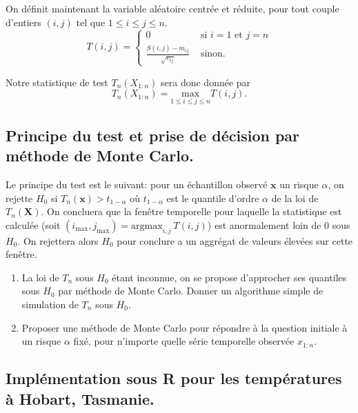 \documentclass[]{article}
\begin{document}
On définit maintenant la variable aléatoire centrée et réduite, pour
tout couple d'entiers \((i, j)\) tel que \(1 \leq i\leq j\leq n\).
\[T(i, j) = \left\lbrace \begin{array}{lr}
0&\text{ si } i = 1 \text{ et } j = n\\
\frac{S(i, j) - m_{ij}}{\sqrt{v_{ij}}} & \text{ sinon.} 
\end{array}
\right.\]

Notre statistique de test \(T_n(X_{1:n})\) sera donc donnée par
\begin{equation}
\label{eq:stat:T}
T_n(X_{1:n}) = \underset{1 \leq i\leq j\leq n}{\text{max}} T(i, j).
\end{equation}

\hypertarget{principe-du-test-et-prise-de-duxe9cision-par-muxe9thode-de-monte-carlo.}{%
\subsection{Principe du test et prise de décision par méthode de Monte
Carlo.}\label{principe-du-test-et-prise-de-duxe9cision-par-muxe9thode-de-monte-carlo.}}

Le principe du test est le suivant: pour un échantillon observé
\(\mathbf{x}\) un risque \(\alpha\), on rejette \(H_0\) si
\(T_n(\mathbf{x}) > t_{1 - \alpha}\) où \(t_{1 - \alpha}\) est le
quantile d'ordre \(\alpha\) de la loi de \(T_n(\mathbf{X})\). On
concluera que la fenêtre temporelle pour laquelle la statistique est
calculée (soit
\((i_{\text{max} },j_{\text{max}}) = \text{argmax}_{i,j}~T(i,j)\)) est
anormalement loin de 0 sous \(H_0\). On rejettera alors \(H_0\) pour
conclure a un aggrégat de valeurs élevées sur cette fenêtre.

\begin{enumerate}
\def\labelenumi{\arabic{enumi}.}
\setcounter{enumi}{4}
\item
  La loi de \(T_n\) sous \(H_0\) étant inconnue, on se propose
  d'approcher ses quantiles sous \(H_0\) par méthode de Monte Carlo.
  Donner un algorithme simple de simulation de \(T_n\) sous \(H_0\).
\item
  Proposer une méthode de Monte Carlo pour répondre à la question
  initiale à un risque \(\alpha\) fixé, pour n'importe quelle série
  temporelle observée \(x_{1:n}\).
\end{enumerate}

\hypertarget{impluxe9mentation-sous-r-pour-les-tempuxe9ratures-uxe0-hobart-tasmanie.}{%
\subsection{Implémentation sous R pour les températures à Hobart,
Tasmanie.}\label{impluxe9mentation-sous-r-pour-les-tempuxe9ratures-uxe0-hobart-tasmanie.}}
\end{document}
